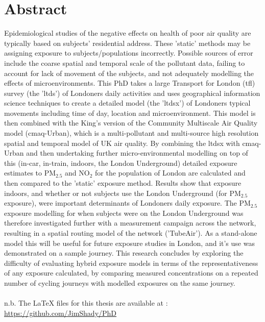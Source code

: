 \documentclass[12pt]{report}
\author{James D Smith, MSc, BA, PgCert, PgDip \vspace{2cm} \\ 
\multicolumn{1}{p{.7\textwidth}}{\centering Environmental Research Group, School of Analytical \& Environmental Sciences, Faculty of Life Sciences \& Medicine, King's College London}}
\date{Thesis submitted to King's College London in fulfillment of the requirements for the degree of Doctor of Philosophy \vspace{2cm} \\ 
December 2018}
\begin{document}
\maketitle

\chapter*{Abstract}

Epidemiological studies of the negative effects on health of poor air quality are typically based on subjects' residential address. These 'static' methods may be assigning exposure to subjects/populations incorrectly. Possible sources of error include the coarse spatial and temporal scale of the pollutant data, failing to account for lack of movement of the subjects, and not adequately modelling the effects of microenvironments. This PhD takes a large Transport for London (\gls{tfl}) survey (the '\gls{ltds}') of Londoners daily activities and uses geographical information science techniques to create a detailed model (the '\gls{ltdsx}') of Londoners typical movements including time of day, location and microenvironment. This model is then combined with the King’s version of the Community Multiscale Air Quality model (\gls{cmaq}-Urban), which is a multi-pollutant and multi-source high resolution spatial and temporal model of UK air quality. By combining the \gls{ltdsx} with \gls{cmaq}-Urban and then undertaking further micro-environmental modelling on top of this (in-car, in-train, indoors, the London Underground) detailed exposure estimates to PM$_{2.5}$ and NO$_{2}$ for the population of London are calculated and then compared to the 'static' exposure method. Results show that exposure indoors, and whether or not subjects use the London Underground (for PM$_{2.5}$ exposure), were important determinants of Londoners daily exposure. The PM$_{2.5}$ exposure modelling for when subjects were on the London Underground was therefore investigated further with a measurement campaign across the network, resulting in a spatial routing model of the network ('TubeAir'). As a stand-alone model this will be useful for future exposure studies in London, and it’s use was demonstrated on a sample journey. This research concludes by exploring the difficulty of evaluating hybrid exposure models in terms of the representativeness of any exposure calculated, by comparing measured concentrations on a repeated number of cycling journeys with modelled exposures on the same journey.
\\
\\
n.b. The LaTeX files for this thesis are available at : \url{https://github.com/JimShady/PhD}
\end{document}
